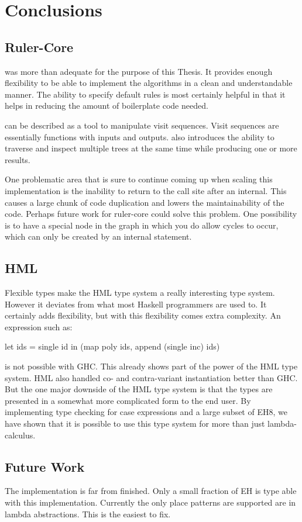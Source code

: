 \chapter{Conclusions}
\section{Ruler-Core}
\Rcore was more than adequate for the purpose of this Thesis. It provides enough flexibility to be able to implement the algorithms in a clean and understandable manner. The ability to specify default rules is most certainly helpful in that it helps in reducing the amount of boilerplate code needed.

\Rcore can be described as a tool to manipulate visit sequences. Visit sequences are essentially functions with inputs and outputs. \Rcore also introduces the ability to traverse and inspect multiple trees at the same time while producing one or more results. 

One problematic area that is sure to continue coming up when scaling this implementation is the inability to return to the call site after an internal.
This causes a large chunk of code duplication and lowers the maintainability of the code. Perhaps future work for ruler-core could solve this problem. One possibility is to have a special node in the graph in which you do allow cycles to occur, which can only be created by an internal statement.
\section{HML}
Flexible types make the HML type system a really interesting type system. However it deviates from what most Haskell programmers are used to. It certainly adds flexibility, but with this flexibility comes extra complexity. 
An expression such as:
\begin{code}
let ids = single id 
in (map poly ids, append (single inc) ids)
\end{code}
is not possible with GHC. This already shows part of the power of the HML type system. HML also handled co- and contra-variant instantiation better than GHC. But the one major downside of the HML type system is that the types are presented in a somewhat more complicated form to the end user. 
By implementing type checking for case expressions and a large subset of EH8, we have shown that it is possible to use this type system for more than just lambda-calculus. 
 
\section{Future Work}
The implementation is far from finished. Only a small fraction of EH is type able with this implementation. Currently the only place patterns are supported are in lambda abstractions. This is the easiest to fix.

